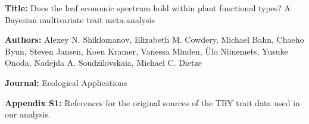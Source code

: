 \documentclass[11pt]{article}
\date{}
\title{}
\begin{document}
\noindent \textbf{Title:}
Does the leaf economic spectrum hold within plant functional types?
A Bayesian multivariate trait meta-analysis

\noindent \textbf{Authors:}
Alexey N. Shiklomanov,
Elizabeth M. Cowdery,
Michael Bahn,
Chaeho Byun,
Steven Jansen,
Koen Kramer,
Vanessa Minden,
Ülo Niinemets,
Yusuke Onoda,
Nadejda A. Soudzilovskaia,
Michael C. Dietze

\noindent \textbf{Journal:} Ecological Applications

\vspace{\baselineskip}

\noindent
\textbf{Appendix S1:} References for the original sources of the TRY trait data used in our analysis.

\vspace{\baselineskip}

\nocite{kleyer_2008_leda_traitbase}

\nocite{wirth_2009_imprint}

\nocite{baraloto_2010_decoupled}

\nocite{craine_2009_global}

\nocite{veihmeyer_1956_soil_moisture}

\nocite{cerabolini_2010_can}

\nocite{wright_2010_functional}

\nocite{wright_2004_worldwide}

\nocite{ogaya_2003_comparative}

\nocite{akhmetzhanova_2012_rediscovered_treasure}

\nocite{frenette-dussault_2011_functional}

\nocite{medlyn_1999_effects}

\nocite{kattge_2009_quantifying}

\nocite{laughlin_2011_climatic}

\nocite{campetella_2011_patterns}

\nocite{auger_2012_inter}

\nocite{fyllas_2009_basin}

\nocite{blonder_2012_leaf}

\nocite{cornelissen_2003_functional}

\nocite{cavender-bares_2006_phylogenetic}

\nocite{garnier_2007_assessing}

\nocite{prentice_2010_evidence}

\nocite{brown_2011_assessing}

\nocite{schweingruber_2005}
\end{document}
